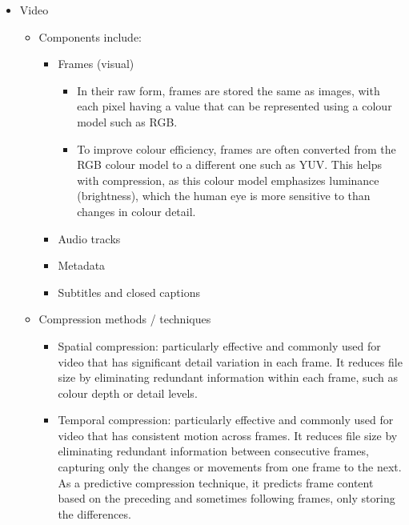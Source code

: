 \begin{itemize}
\begin{enumerate}
		\item Formula for calculating audio size:
		\[\text{file size (bits)}=\text{sampling rate}\times \text{bit depth}\times\text{\# of channels}\]
		\item Many formats to choose from for storing audio files: (They mainly differ by whether they are compressed or uncompressed)
		\begin{itemize}
		    \item Uncompressed formats store the raw binary data (e.g. WAV, AIFF)
		    \item Compressed formats use algorithms to reduce the file size for storage or transmission (e.g. MP3, FLAC)
		    \end{itemize}
        \end{enumerate}
    \item Video
    \begin{itemize}
        \item Components include:
        \begin{itemize}
            \item Frames (visual)
            \begin{itemize}
                \item In their raw form, frames are stored the same as images, with each pixel having a value that can be represented using a colour model such as RGB.
                \item To improve colour efficiency, frames are often converted from the RGB colour model to a different one such as YUV. This helps with compression, as this colour model emphasizes luminance (brightness), which the human eye is more sensitive to than changes in colour detail. 
                \end{itemize}
            \item Audio tracks
            \item Metadata
            \item Subtitles and closed captions
            \end{itemize}
			\item Compression methods / techniques
			\begin{itemize}
			    \item Spatial compression: particularly effective and commonly used for video that has significant detail variation in each frame. It reduces file size by eliminating redundant information within each frame, such as colour depth or detail levels.
			    \item Temporal compression: particularly effective and commonly used for video that has consistent motion across frames. It reduces file size by eliminating redundant information between consecutive frames, capturing only the changes or movements from one frame to the next. As a predictive compression technique, it predicts frame content based on the preceding and sometimes following frames, only storing the differences.
			    \end{itemize}
        \end{itemize}
\end{itemize}
